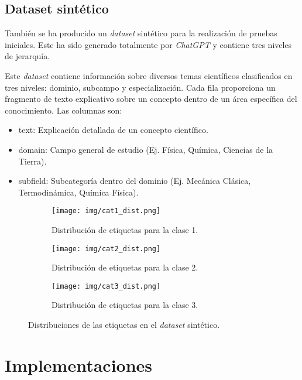 \documentclass[12pt,letterpaper]{article}
\begin{document}
\subsection{Dataset sintético}
También se ha producido un \textit{dataset} sintético para la realización de pruebas iniciales. Este ha sido generado totalmente por \textit{ChatGPT} y contiene tres niveles de jerarquía.

Este \textit{dataset} contiene información sobre diversos temas científicos clasificados en tres niveles: dominio, subcampo y especialización. Cada fila proporciona un fragmento de texto explicativo sobre un concepto dentro de un área específica del conocimiento.
Las columnas son:
\begin{itemize}
    \item text: Explicación detallada de un concepto científico.
    \item domain: Campo general de estudio (Ej. Física, Química, Ciencias de la Tierra).
    \item subfield: Subcategoría dentro del dominio (Ej. Mecánica Clásica, Termodinámica, Química Física).
\end{itemize}

\begin{figure}[htp]
    \centering
    \begin{subfigure}[b]{0.6\textwidth}
        \centering
        \texttt{[image: img/cat1\_dist.png]}
        \caption{Distribución de etiquetas para la clase 1.}
        \label{fig:cat1}
    \end{subfigure}
    \hfill
    \begin{subfigure}[b]{0.6\textwidth}
        \centering
        \texttt{[image: img/cat2\_dist.png]}
        \caption{Distribución de etiquetas para la clase 2.}
        \label{fig:cat2}
    \end{subfigure}
    \hfill
    \begin{subfigure}[b]{0.6\textwidth}
        \centering
        \texttt{[image: img/cat3\_dist.png]}
        \caption{Distribución de etiquetas para la clase 3.}
        \label{fig:cat3}
    \end{subfigure}
    \caption{Distribuciones de las etiquetas en el \textit{dataset} sintético.}
    \label{fig:synthetic}
\end{figure}

\section{Implementaciones}
\end{document}
